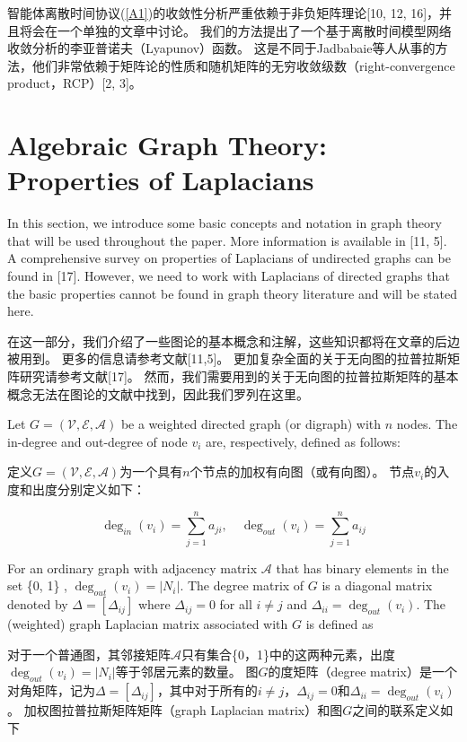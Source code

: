 \documentclass{article}
\begin{document}
智能体离散时间协议(\ref{A1})的收敛性分析严重依赖于非负矩阵理论[10, 12, 16]，并且将会在一个单独的文章中讨论。
我们的方法提出了一个基于离散时间模型网络收敛分析的李亚普诺夫（Lyapunov）函数。
这是不同于Jadbabaie等人从事的方法，他们非常依赖于矩阵论的性质和随机矩阵的无穷收敛级数（right-convergence product，RCP）[2, 3]。

\section{Algebraic Graph Theory: Properties of Laplacians}
{\color[gray]{0.5}
\noindent In this section, we introduce some basic concepts and notation in graph theory that will be used throughout the paper. 
More information is available in [11, 5]. 
A comprehensive survey on properties of Laplacians of undirected graphs can be found in [17]. 
However, we need to work with Laplacians of directed graphs that the basic properties cannot be found in graph theory literature and will be stated here.
}

\noindent 在这一部分，我们介绍了一些图论的基本概念和注解，这些知识都将在文章的后边被用到。
更多的信息请参考文献[11,5]。
更加复杂全面的关于无向图的拉普拉斯矩阵研究请参考文献[17]。
然而，我们需要用到的关于无向图的拉普拉斯矩阵的基本概念无法在图论的文献中找到，因此我们罗列在这里。

{\color[gray]{0.5}
Let $G=(\mathcal{V}, \mathcal{E}, \mathcal{A})$ be a weighted directed graph (or digraph) with $n$ nodes. 
The in-degree and out-degree of node $v_i$ are, respectively, deﬁned as follows:
}

定义$G=(\mathcal{V}, \mathcal{E}, \mathcal{A})$为一个具有$n$个节点的加权有向图（或有向图）。
节点$v_i$的入度和出度分别定义如下：

\begin{equation}
    \deg_{in}(v_i) = \sum_{j=1}^{n}a_{ji},\quad \deg_{out}(v_i) = \sum_{j=1}^{n}a_{ij}
    \tag{11}
    \label{11}
\end{equation}

{\color[gray]{0.5}
\noindent For an ordinary graph with adjacency matrix $\mathcal{A}$ that has binary elements in the set \{0, 1\} , $\deg_{out}(v_i) = |N_i|$. 
The degree matrix of $G$ is a diagonal matrix denoted by $\Delta=[\Delta_{ij}]$ where $\Delta_{ij}=0$ for all $i\ne j$ and $\Delta_{ii}=\deg_{out}(v_i)$. 
The (weighted) graph Laplacian matrix associated with $G$ is deﬁned as
}

\noindent 对于一个普通图，其邻接矩阵$\mathcal{A}$只有集合\{0，1\}中的这两种元素，出度$\deg_{out}(v_i) = |N_i|$等于邻居元素的数量。
图$G$的度矩阵（degree matrix）是一个对角矩阵，记为$\Delta=[\Delta_{ij}]$，其中对于所有的$i\ne j$，$\Delta_{ij}=0$和$\Delta_{ii}=\deg_{out}(v_i)$。
加权图拉普拉斯矩阵矩阵（graph Laplacian matrix）和图$G$之间的联系定义如下
\end{document}
